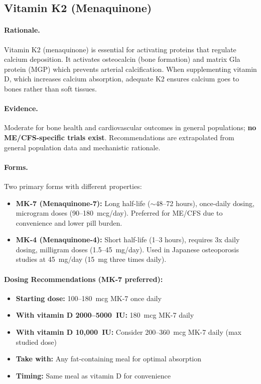 \subsection{Vitamin K2 (Menaquinone)}

\paragraph{Rationale.} Vitamin K2 (menaquinone) is essential for activating proteins that regulate calcium deposition. It activates osteocalcin (bone formation) and matrix Gla protein (MGP) which prevents arterial calcification. When supplementing vitamin D, which increases calcium absorption, adequate K2 ensures calcium goes to bones rather than soft tissues.

\paragraph{Evidence.} Moderate for bone health and cardiovascular outcomes in general populations; \textbf{no ME/CFS-specific trials exist}. Recommendations are extrapolated from general population data and mechanistic rationale.

\paragraph{Forms.} Two primary forms with different properties:
\begin{itemize}
    \item \textbf{MK-7 (Menaquinone-7):} Long half-life ($\sim$48--72 hours), once-daily dosing, microgram doses (90--180~mcg/day). Preferred for ME/CFS due to convenience and lower pill burden.
    \item \textbf{MK-4 (Menaquinone-4):} Short half-life (1--3 hours), requires 3x daily dosing, milligram doses (1.5--45~mg/day). Used in Japanese osteoporosis studies at 45~mg/day (15~mg three times daily).
\end{itemize}

\paragraph{Dosing Recommendations (MK-7 preferred):}
\begin{itemize}
    \item \textbf{Starting dose:} 100--180~mcg MK-7 once daily
    \item \textbf{With vitamin D 2000--5000~IU:} 180~mcg MK-7 daily
    \item \textbf{With vitamin D 10,000~IU:} Consider 200--360~mcg MK-7 daily (max studied dose)
    \item \textbf{Take with:} Any fat-containing meal for optimal absorption
    \item \textbf{Timing:} Same meal as vitamin D for convenience
\end{itemize}

